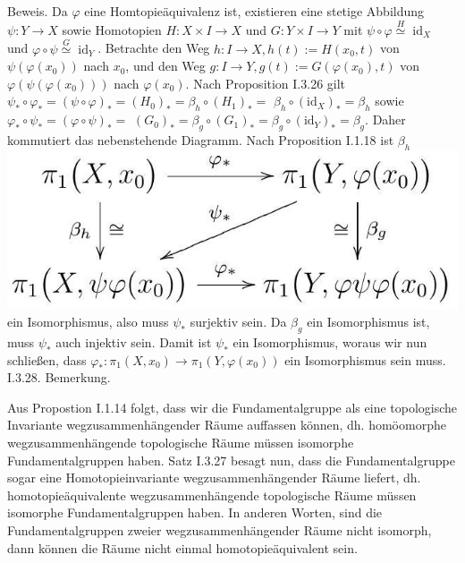 \documentclass[10pt, letterpaper]{article}
\begin{document}
Beweis. Da $\varphi$ eine Homtopieäquivalenz ist, existieren eine stetige Abbildung $\psi: Y \rightarrow X$ sowie Homotopien $H: X \times I \rightarrow X$ und $G: Y \times I \rightarrow Y$ mit $\psi \circ \varphi \stackrel{H}{\simeq} \operatorname{id}_{X}$ und $\varphi \circ \psi \stackrel{G}{\simeq} \operatorname{id}_{Y}$. Betrachte den Weg $h: I \rightarrow X, h(t):=H\left(x_{0}, t\right)$ von $\psi\left(\varphi\left(x_{0}\right)\right)$ nach $x_{0}$, und den Weg $g: I \rightarrow Y, g(t):=G\left(\varphi\left(x_{0}\right), t\right)$ von $\varphi\left(\psi\left(\varphi\left(x_{0}\right)\right)\right)$ nach $\varphi\left(x_{0}\right)$. Nach Proposition I.3.26 gilt $\psi_{*} \circ \varphi_{*}=(\psi \circ \varphi)_{*}=\left(H_{0}\right)_{*}=\beta_{h} \circ\left(H_{1}\right)_{*}=$ $\beta_{h} \circ\left(\mathrm{id}_{X}\right)_{*}=\beta_{h}$ sowie $\varphi_{*} \circ \psi_{*}=(\varphi \circ \psi)_{*}=$ $\left(G_{0}\right)_{*}=\beta_{g} \circ\left(G_{1}\right)_{*}=\beta_{g} \circ\left(\mathrm{id}_{Y}\right)_{*}=\beta_{g}$. Daher kommutiert das nebenstehende Diagramm. Nach Proposition I.1.18 ist $\beta_{h}$\\
\includegraphics[max width=\textwidth]{2025_06_05_d7ed2bacd1e9ce1db1f0g-030} ein Isomorphismus, also muss $\psi_{*}$ surjektiv sein. Da $\beta_{g}$ ein Isomorphismus ist, muss $\psi_{*}$ auch injektiv sein. Damit ist $\psi_{*}$ ein Isomorphismus, woraus wir nun schließen, dass $\varphi_{*}: \pi_{1}\left(X, x_{0}\right) \rightarrow \pi_{1}\left(Y, \varphi\left(x_{0}\right)\right)$ ein Isomorphismus sein muss.\\



I.3.28. Bemerkung. 

Aus Propostion I.1.14 folgt, dass wir die Fundamentalgruppe als eine topologische Invariante wegzusammenhängender Räume auffassen können, dh. homöomorphe wegzusammenhängende topologische Räume müssen isomorphe Fundamentalgruppen haben. Satz I.3.27 besagt nun, dass die Fundamentalgruppe sogar eine Homotopieinvariante wegzusammenhängender Räume liefert, dh. homotopieäquivalente wegzusammenhängende topologische Räume müssen isomorphe Fundamentalgruppen haben. In anderen Worten, sind die Fundamentalgruppen zweier wegzusammenhängender Räume nicht isomorph, dann können die Räume nicht einmal homotopieäquivalent sein.
\end{document}
